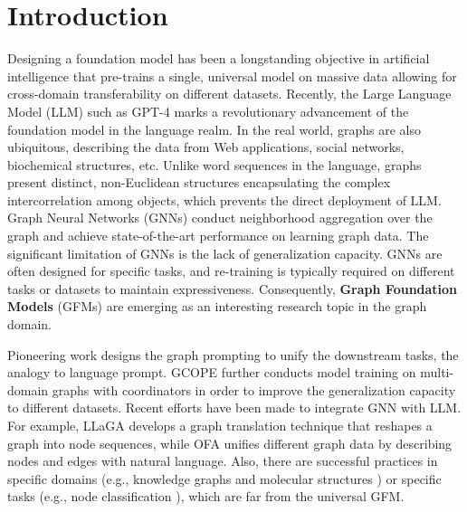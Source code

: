 
\section{Introduction}




Designing a foundation model has been a longstanding objective in artificial intelligence that pre-trains a single, universal model on massive data allowing for cross-domain transferability on different datasets. 
Recently, the Large Language Model (LLM) such as GPT-4 \cite{2024gpt4} marks a revolutionary advancement of the foundation model in the language realm.
In the real world, graphs are also ubiquitous, describing the data from Web applications, social networks, biochemical structures, etc.
Unlike word sequences in the language, graphs present distinct, non-Euclidean structures encapsulating the complex intercorrelation among objects,
which prevents the direct deployment of LLM.
Graph Neural Networks (GNNs) \cite{nips18hnn,iclr17gcn,iclr18gat,icml19sgc} conduct neighborhood aggregation over the graph and achieve state-of-the-art performance on learning graph data.
The significant limitation of GNNs is the lack of generalization capacity. 
GNNs are often designed for specific tasks, and re-training is typically required on different tasks or datasets to maintain expressiveness.
Consequently, \textbf{Graph Foundation Models} (GFMs) are emerging as an interesting research topic in the graph domain.

Pioneering work \cite{kdd23all-in-one} designs the graph prompting to unify the downstream tasks, the analogy to language prompt.
GCOPE \cite{kdd24gcope} further conducts model training on multi-domain graphs with coordinators in order to improve the generalization capacity to different datasets.
Recent efforts have been made to integrate GNN with LLM. 
For example, LLaGA \cite{icml24llaga} develops a graph translation technique that reshapes a graph into node sequences,
while OFA \cite{iclr24ofa}  unifies different graph data by describing nodes and edges with natural language.
Also, there are successful practices in specific domains (e.g., knowledge graphs \cite{nips23prodigy,iclr24ultra} and molecular structures \cite{iclr24Beaini}) or specific tasks (e.g., node classification \cite{zhao2024graphany}), which are far from the universal GFM.

